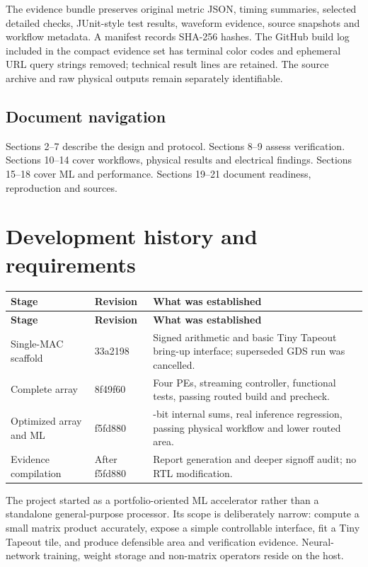 \documentclass[10pt,letterpaper]{article}
\begin{document}
The evidence bundle preserves original metric JSON, timing summaries, selected detailed checks, JUnit-style test results, waveform evidence, source snapshots and workflow metadata. A manifest records SHA-256 hashes. The GitHub build log included in the compact evidence set has terminal color codes and ephemeral URL query strings removed; technical result lines are retained. The source archive and raw physical outputs remain separately identifiable.

\subsection*{Document navigation}
Sections 2--7 describe the design and protocol. Sections 8--9 assess verification. Sections 10--14 cover workflows, physical results and electrical findings. Sections 15--18 cover ML and performance. Sections 19--21 document readiness, reproduction and sources.

\clearpage
\section{Development history and requirements}
{\small\begin{longtable}{>{\raggedright\arraybackslash}p{0.242647\dimexpr\linewidth-6\tabcolsep\relax}>{\raggedright\arraybackslash}p{0.147059\dimexpr\linewidth-6\tabcolsep\relax}>{\raggedright\arraybackslash}p{0.610294\dimexpr\linewidth-6\tabcolsep\relax}}\toprule
\textbf{Stage} & \textbf{Revision} & \textbf{What was established}\\\midrule\endfirsthead\textbf{Stage} & \textbf{Revision} & \textbf{What was established}\\\midrule\endhead
Single-MAC scaffold & 33a2198 & Signed arithmetic and basic Tiny Tapeout bring-up interface; superseded GDS run was cancelled.\\
Complete array & 8f49f60 & Four PEs, streaming controller, functional tests, passing routed build and precheck.\\
Optimized array and ML & f5fd880 & 12-bit internal sums, real inference regression, passing physical workflow and lower routed area.\\
Evidence compilation & After f5fd880 & Report generation and deeper signoff audit; no RTL modification.\\
\bottomrule\end{longtable}}
The project started as a portfolio-oriented ML accelerator rather than a standalone general-purpose processor. Its scope is deliberately narrow: compute a small matrix product accurately, expose a simple controllable interface, fit a Tiny Tapeout tile, and produce defensible area and verification evidence. Neural-network training, weight storage and non-matrix operators reside on the host.
\end{document}
